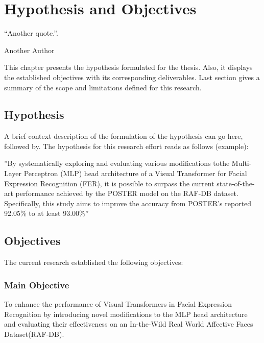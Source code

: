 \chapter{Hypothesis and Objectives}
\label{chapter:hypothesis-objectives}
\epigraph{``Another quote.''.}{\vspace{10pt}Another Author}

\newpage

This chapter presents the hypothesis formulated for the thesis. Also, it displays the established objectives with its corresponding deliverables. Last section gives a summary of the scope and limitations defined for this research.

\section{Hypothesis}
\label{section:hypothesis}
A brief context description of the formulation of the hypothesis can go here, followed by.
The hypothesis for this research effort reads as follows (example):


''By systematically exploring and evaluating various modifications tothe Multi-Layer Perceptron (MLP) head architecture of a Visual Transformer for Facial Expression
Recognition (FER), it is possible to surpass the current state-of-the-art performance achieved by the POSTER model on the RAF-DB dataset. Specifically, this study aims
to improve the accuracy from POSTER’s reported 92.05\% to at least 93.00\%''

\section{Objectives}
\label{section:objectives}
The current research established the following objectives:

\subsection{Main Objective}
\label{section:main-objective}
\label{objective:main}

To enhance the performance of Visual Transformers in Facial Expression Recognition by introducing novel modifications to the MLP head architecture and evaluating their
effectiveness on an In-the-Wild Real World Affective Faces Dataset(RAF-DB).


